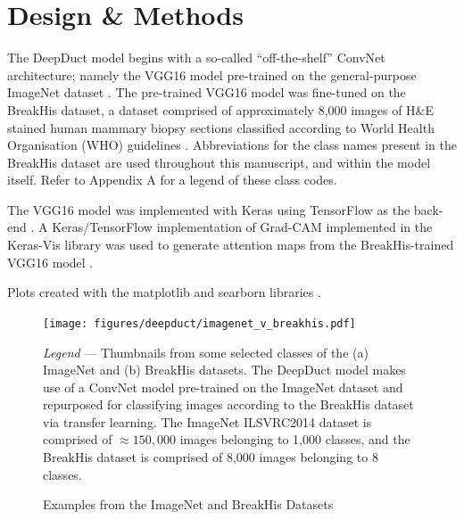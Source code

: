 \section{Design \& Methods}

The DeepDuct model begins with a so-called ``off-the-shelf'' ConvNet architecture; namely the VGG16 model pre-trained on the general-purpose ImageNet dataset \citep{simonyan2014,deng2009,imagenet}. The pre-trained VGG16 model was fine-tuned on the BreakHis dataset, a dataset comprised of approximately 8,000 images of H\&E stained human mammary biopsy sections classified according to World Health Organisation (WHO) guidelines \citep{spanhol2016, who_breast}. Abbreviations for the class names present in the BreakHis dataset are used throughout this manuscript, and within the model itself. Refer to Appendix A for a legend of these class codes. \par

The VGG16 model was implemented with Keras using TensorFlow as the back-end \citep{chollet2015, tensorflow}. A Keras/TensorFlow implementation of Grad-CAM implemented in the Keras-Vis library was used to generate attention maps from the BreakHis-trained VGG16 model \citep{raghakot}.\par

Plots created with the matplotlib and searborn libraries \citep{hunter2007, seaborn}.

\begin{figure}[h]
	\begin{center}
		\caption{Examples from the ImageNet and BreakHis Datasets \label{fig:imagenet_v_breakhis}}
	\end{center}
	\texttt{[image: figures/deepduct/imagenet\_v\_breakhis.pdf]}
	\begin{singlespace}
		\textit{Legend} --- Thumbnails from some selected classes of the (a) ImageNet and (b) BreakHis datasets. The DeepDuct model makes use of a ConvNet model pre-trained on the ImageNet dataset and repurposed for classifying images according to the BreakHis dataset via transfer learning. The ImageNet ILSVRC2014 dataset is comprised of $\approx150,000$ images belonging to 1,000 classes, and the BreakHis dataset is comprised of 8,000 images belonging to 8 classes. 
	\end{singlespace}
	
\end{figure}

